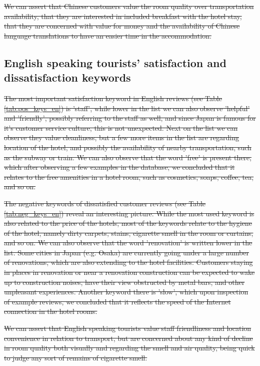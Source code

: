 \documentclass[review]{elsarticle}
\providecommand{\DIFdel}[1]{{\protect\color{red}\sout{#1}}}                      %
\providecommand{\DIFdelbegin}{} %
\providecommand{\DIFdelend}{} %
\newcommand{\DIFscaledelfig}{0.5}
\newlength{\DIFdelgraphicswidth} %
\newlength{\DIFdelgraphicsheight} %
\newcommand{\DIFdelincludegraphics}[2][]{%
\sbox{\DIFdelgraphicsbox}{\DIFOincludegraphics[#1]{#2}}%
\settoboxwidth{\DIFdelgraphicswidth}{\DIFdelgraphicsbox} %
\settoboxtotalheight{\DIFdelgraphicsheight}{\DIFdelgraphicsbox} %
\scalebox{\DIFscaledelfig}{%
\parbox[b]{\DIFdelgraphicswidth}{\usebox{\DIFdelgraphicsbox}\\[-\baselineskip] \rule{\DIFdelgraphicswidth}{0em}}\llap{\resizebox{\DIFdelgraphicswidth}{\DIFdelgraphicsheight}{%
\setlength{\unitlength}{\DIFdelgraphicswidth}%
\begin{picture}(1,1)%
\thicklines\linethickness{2pt} %
{\color[rgb]{1,0,0}\put(0,0){\framebox(1,1){}}}%
{\color[rgb]{1,0,0}\put(0,0){\line( 1,1){1}}}%
{\color[rgb]{1,0,0}\put(0,1){\line(1,-1){1}}}%
\end{picture}%
}\hspace*{3pt}}} %
} %
\DeclareRobustCommand{\DIFdelbegin}{\DIFOdelbegin \let\includegraphics\DIFdelincludegraphics} %
\DeclareRobustCommand{\DIFdelend}{\DIFOaddend \let\includegraphics\DIFOincludegraphics} %
\begin{document}
\DIFdel{We can assert that Chinese customers value the room quality over transportation availability, that they are interested in included breakfast with the hotel stay, that they are concerned with value for money and the availability of Chinese language translations to have an easier time in the accommodation.}
\DIFdelend

\subsection{English speaking tourists' satisfaction and dissatisfaction keywords}

\DIFdelbegin\DIFdel{The most important satisfaction keyword in English reviews (see Table \ref{tab:pos_keys_en}) is 'staff', while lower in the list we can also observe 'helpful' and 'friendly', possibly referring to the staff as well, and since Japan is famous for it's customer service culture, this is not unexpected. Next on the list we can observe they value cleanliness, but a few more items in the list are regarding location of the hotel, and possibly the availability of nearby transportation, such as the subway or train. We can also observe that the word 'free' is present there, which after observing a few examples in the database, we concluded that it relates to the free amenities in a hotel room, such as cosmetics, soaps, coffee, tea, and so on.}

\DIFdel{The negative keywords of dissatisfied customer reviews (see Table \ref{tab:neg_keys_en}) reveal an interesting picture. While the most used keyword is also related to the price of the hotels, most of the keywords relate to the hygiene of the hotel, namely dirty carpets, stains, cigarette smell in the room or curtains, and so on. We can also observe that the word 'renovation' is written lower in the list. Some cities in Japan (e.g. Osaka) are currently going under a large number of renovations, which are also extending to the hotel facilities. Customers staying in places in renovation or near a renovation construction can be expected to wake up to construction noises, have their view obstructed by metal bars, and other unpleasant experiences. Another keyword there is 'slow', which upon inspection of example reviews, we concluded that it reflects the speed of the Internet connection in the hotel rooms.}

\DIFdel{We can assert that English speaking tourists value staff friendliness and location convenience in relation to transport, but are concerned about any kind of decline in room quality both visually and regarding the smell and air quality, being quick to judge any sort of remains of cigarette smell.}\DIFdelend
\end{document}
